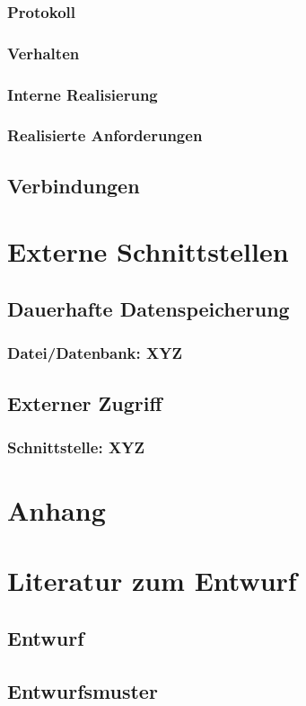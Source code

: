 \documentclass[a4paper,12pt]{scrartcl}
\begin{document}
\subsubsection{Protokoll}
\subsubsection{Verhalten}
\subsubsection{Interne Realisierung}
\subsubsection{Realisierte Anforderungen}
\subsection{Verbindungen}

\section{Externe Schnittstellen}
\subsection{Dauerhafte Datenspeicherung}
\subsubsection{Datei/Datenbank: XYZ}
\subsection{Externer Zugriff}
\subsubsection{Schnittstelle: XYZ}

\appendix%

\section{Anhang}

\section{Literatur zum Entwurf}
\subsection{Entwurf}
\subsection{Entwurfsmuster}
\end{document}
